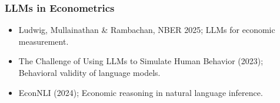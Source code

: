\documentclass[11pt,a4paper]{article}
\begin{document}
\subsubsection{LLMs in Econometrics}
\begin{itemize}
\item Ludwig, Mullainathan \& Rambachan, NBER 2025; LLMs for economic measurement.
\item The Challenge of Using LLMs to Simulate Human Behavior (2023); Behavioral validity of language models.
\item EconNLI (2024); Economic reasoning in natural language inference.
\end{itemize}
\end{document}
